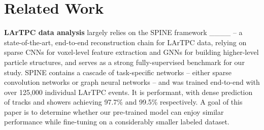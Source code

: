 \section{Related Work}
\textbf{LArTPC data analysis} largely relies on the \textsc{SPINE} framework ____ -- a state-of-the-art, end-to-end reconstruction chain for LArTPC data, relying on sparse CNNs for voxel-level feature extraction and GNNs for building higher-level particle structures, and serves as a strong fully-supervised benchmark for our study. \textsc{SPINE} contains a cascade of task-specific networks -- either sparse convolution networks or graph neural networks -- and was trained end-to-end with over 125,000 individual LArTPC events. It is performant, with dense prediction of tracks and showers achieving 97.7\% and 99.5\% respectively. A goal of this paper is to determine whether our pre-trained model can enjoy similar performance while fine-tuning on a considerably smaller labeled dataset.


